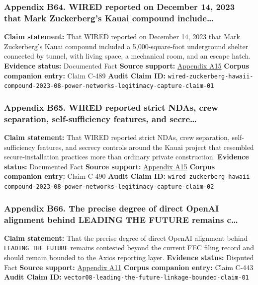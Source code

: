 \documentclass[
  american,
  11pt,
  letterpaper,
]{article}
\begin{document}
\subsubsection{Appendix B64. WIRED reported on December 14, 2023 that
Mark Zuckerberg's Kauai compound
include\ldots{}}\label{appendix-b64-wired-reported-on-december-14-2023-that-mark-zuckerberg-s-kauai-compound-include}

\textbf{Claim statement:} That WIRED reported on December 14, 2023 that
Mark Zuckerberg's Kauai compound included a 5,000-square-foot
underground shelter connected by tunnel, with living space, a mechanical
room, and an escape hatch. \textbf{Evidence status:} Documented Fact
\textbf{Source support:}
\hyperref[appendix-a15-inside-mark-zuckerbergs-top-secret-hawaii-compound]{Appendix
A15} \textbf{Corpus companion entry:} Claim C-489 \textbf{Audit Claim
ID:}
\texttt{wired-zuckerberg-hawaii-compound-2023-08-power-networks-legitimacy-capture-claim-01}

\subsubsection{Appendix B65. WIRED reported strict NDAs, crew
separation, self-sufficiency features, and
secre\ldots{}}\label{appendix-b65-wired-reported-strict-ndas-crew-separation-self-sufficiency-features-and-secre}

\textbf{Claim statement:} That WIRED reported strict NDAs, crew
separation, self-sufficiency features, and secrecy controls around the
Kauai project that resembled secure-installation practices more than
ordinary private construction. \textbf{Evidence status:} Documented Fact
\textbf{Source support:}
\hyperref[appendix-a15-inside-mark-zuckerbergs-top-secret-hawaii-compound]{Appendix
A15} \textbf{Corpus companion entry:} Claim C-490 \textbf{Audit Claim
ID:}
\texttt{wired-zuckerberg-hawaii-compound-2023-08-power-networks-legitimacy-capture-claim-02}

\subsubsection{Appendix B66. The precise degree of direct OpenAI
alignment behind LEADING THE FUTURE remains
c\ldots{}}\label{appendix-b66-the-precise-degree-of-direct-openai-alignment-behind-leading-the-future-remains-c}

\textbf{Claim statement:} That the precise degree of direct OpenAI
alignment behind \texttt{LEADING\ THE\ FUTURE} remains contested beyond
the current FEC filing record and should remain bounded to the Axios
reporting layer. \textbf{Evidence status:} Disputed Fact \textbf{Source
support:}
\hyperref[appendix-a11-leading-the-future-committee-overview]{Appendix
A11} \textbf{Corpus companion entry:} Claim C-443 \textbf{Audit Claim
ID:} \texttt{vector08-leading-the-future-linkage-bounded-claim-01}
\end{document}
